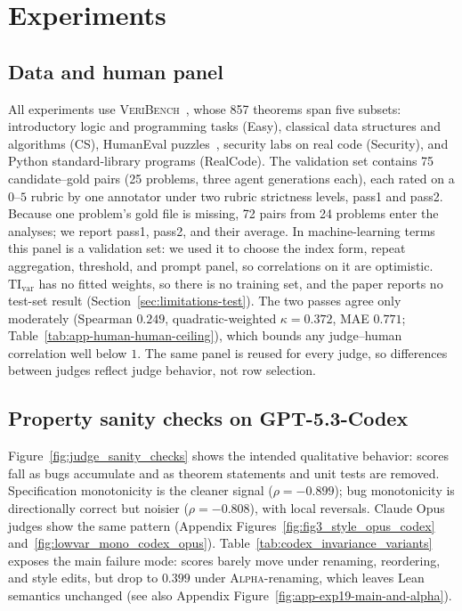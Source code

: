 \section{Experiments}
\subsection{Data and human panel}\label{sec:data-human-protocol}\label{sec:veribench-overview}
All experiments use \textsc{VeriBench}~\citep{miranda2026veribench}, whose 857 theorems span five subsets: introductory logic and programming tasks (Easy), classical data structures and algorithms (CS), HumanEval puzzles~\citep{chen2021evaluating}, security labs on real code (Security), and Python standard-library programs (RealCode).
The validation set contains 75 candidate--gold pairs (25 problems, three agent generations each), each rated on a \(0\)--\(5\) rubric by one annotator under two rubric strictness levels, pass1 and pass2.
Because one problem's gold file is missing, 72 pairs from 24 problems enter the analyses; we report pass1, pass2, and their average.
In machine-learning terms this panel is a validation set: we used it to choose the index form, repeat aggregation, threshold, and prompt panel, so correlations on it are optimistic.
\(\mathrm{TI}_{\mathrm{var}}\) has no fitted weights, so there is no training set, and the paper reports no test-set result (Section~\ref{sec:limitations-test}).
The two passes agree only moderately (Spearman \(0.249\), quadratic-weighted \(\kappa=0.372\), MAE \(0.771\); Table~\ref{tab:app-human-human-ceiling}), which bounds any judge--human correlation well below \(1\).
The same panel is reused for every judge, so differences between judges reflect judge behavior, not row selection.

\subsection{Property sanity checks on GPT-5.3-Codex}
Figure~\ref{fig:judge_sanity_checks} shows the intended qualitative behavior: scores fall as bugs accumulate and as theorem statements and unit tests are removed.
Specification monotonicity is the cleaner signal (\(\rho=-0.899\)); bug monotonicity is directionally correct but noisier (\(\rho=-0.808\)), with local reversals.
Claude Opus judges show the same pattern (Appendix Figures~\ref{fig:fig3_style_opus_codex} and~\ref{fig:lowvar_mono_codex_opus}).
Table~\ref{tab:codex_invariance_variants} exposes the main failure mode: scores barely move under renaming, reordering, and style edits, but drop to \(0.399\) under \textsc{Alpha}-renaming, which leaves Lean semantics unchanged (see also Appendix Figure~\ref{fig:app-exp19-main-and-alpha}).

